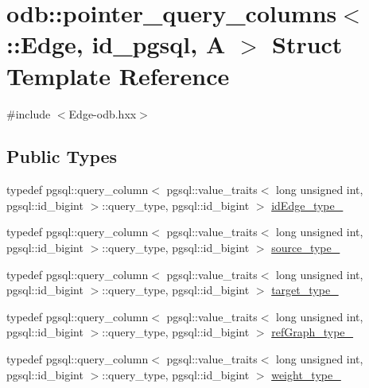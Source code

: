 \hypertarget{structodb_1_1pointer__query__columns_3_01_1_1_edge_00_01id__pgsql_00_01_a_01_4}{}\section{odb\+:\+:pointer\+\_\+query\+\_\+columns$<$ \+:\+:Edge, id\+\_\+pgsql, A $>$ Struct Template Reference}
\label{structodb_1_1pointer__query__columns_3_01_1_1_edge_00_01id__pgsql_00_01_a_01_4}


{\ttfamily \#include $<$Edge-\/odb.\+hxx$>$}

\subsection*{Public Types}
\begin{DoxyCompactItemize}
\item 
typedef pgsql\+::query\+\_\+column$<$ pgsql\+::value\+\_\+traits$<$ long unsigned int, pgsql\+::id\+\_\+bigint $>$\+::query\+\_\+type, pgsql\+::id\+\_\+bigint $>$ \hyperlink{structodb_1_1pointer__query__columns_3_01_1_1_edge_00_01id__pgsql_00_01_a_01_4_a11b96213f73fba1aa683d630be6c0f22}{id\+Edge\+\_\+type\+\_\+}
\item 
typedef pgsql\+::query\+\_\+column$<$ pgsql\+::value\+\_\+traits$<$ long unsigned int, pgsql\+::id\+\_\+bigint $>$\+::query\+\_\+type, pgsql\+::id\+\_\+bigint $>$ \hyperlink{structodb_1_1pointer__query__columns_3_01_1_1_edge_00_01id__pgsql_00_01_a_01_4_a1ffe36e7e69a82a3db331bf051b63b5b}{source\+\_\+type\+\_\+}
\item 
typedef pgsql\+::query\+\_\+column$<$ pgsql\+::value\+\_\+traits$<$ long unsigned int, pgsql\+::id\+\_\+bigint $>$\+::query\+\_\+type, pgsql\+::id\+\_\+bigint $>$ \hyperlink{structodb_1_1pointer__query__columns_3_01_1_1_edge_00_01id__pgsql_00_01_a_01_4_abf77224bd05ad36dff61edc27c551cf7}{target\+\_\+type\+\_\+}
\item 
typedef pgsql\+::query\+\_\+column$<$ pgsql\+::value\+\_\+traits$<$ long unsigned int, pgsql\+::id\+\_\+bigint $>$\+::query\+\_\+type, pgsql\+::id\+\_\+bigint $>$ \hyperlink{structodb_1_1pointer__query__columns_3_01_1_1_edge_00_01id__pgsql_00_01_a_01_4_a5e3584b6e468f979d1c46dc559f90232}{ref\+Graph\+\_\+type\+\_\+}
\item 
typedef pgsql\+::query\+\_\+column$<$ pgsql\+::value\+\_\+traits$<$ long unsigned int, pgsql\+::id\+\_\+bigint $>$\+::query\+\_\+type, pgsql\+::id\+\_\+bigint $>$ \hyperlink{structodb_1_1pointer__query__columns_3_01_1_1_edge_00_01id__pgsql_00_01_a_01_4_a137db0e37f02168fb623e6cf7eb0569a}{weight\+\_\+type\+\_\+}
\end{DoxyCompactItemize}
